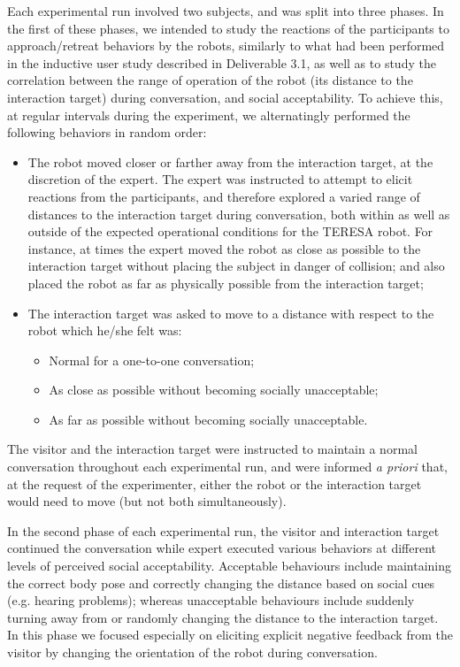 \documentclass[a4paper,11pt]{report}
\begin{document}
Each experimental run involved two subjects, and was split into three phases. In the first of these phases, we intended to study the reactions of the participants to approach/retreat behaviors by the robots, similarly to what had been performed in the inductive user study described in Deliverable 3.1, as well as to study the correlation between the range of operation of the robot (its distance to the interaction target) during conversation, and social acceptability. To achieve this, at regular intervals during the experiment, we alternatingly performed the following behaviors in random order:
\begin{itemize}
\item The robot moved closer or farther away from the interaction target, at the discretion of the expert. The expert was instructed to attempt to elicit reactions from the participants, and therefore explored a varied range of distances to the interaction target during conversation, both within as well as outside of the expected operational conditions for the TERESA robot. For instance, at times the expert moved the robot as close as possible to the interaction target without placing the subject in danger of collision; and also placed the robot as far as physically possible from the interaction target;
\item The interaction target was asked to move to a distance with respect to the robot which he/she felt was:
  \begin{itemize}
  \item Normal for a one-to-one conversation;
  \item As close as possible without becoming socially unacceptable;
  \item As far as possible without becoming socially unacceptable.
  \end{itemize}
\end{itemize}

The visitor and the interaction target were instructed to maintain a normal conversation throughout each experimental run, and were informed \emph{a priori} that, at the request of the experimenter, either the robot or the interaction target would need to move (but not both simultaneously).

In the second phase of each experimental run, the visitor and interaction target continued the conversation while expert executed various behaviors at different levels of perceived social acceptability. Acceptable behaviours include maintaining the correct body pose and correctly changing the distance based on social cues (e.g. hearing problems); whereas unacceptable behaviours include suddenly turning away from or randomly changing the distance to the interaction target. In this phase we focused especially on eliciting explicit negative feedback from the visitor by changing the orientation of the robot during conversation.
\end{document}
